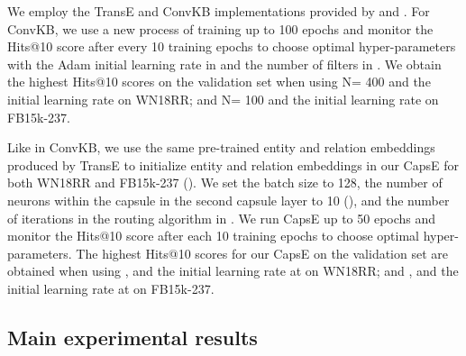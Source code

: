\documentclass[11pt,a4paper]{article}
\begin{document}
We employ the TransE and ConvKB implementations provided by \citet{NguyenNAACL2016} and \citet{Nguyen2018}. 
For ConvKB, we use a new process of training up to 100 epochs and monitor the Hits@10 score after every 10 training epochs to choose optimal hyper-parameters with the Adam initial learning rate in  and the number of filters  in .
We obtain the highest Hits@10 scores on the validation set when using N= 400 and the initial learning rate  on WN18RR; and N= 100 and the initial learning rate  on FB15k-237.

Like in ConvKB, we use the same pre-trained entity and relation embeddings produced by TransE to initialize entity and relation embeddings in our CapsE for both WN18RR and FB15k-237 ().
We set the batch size to 128, the number of neurons within the capsule in the second capsule layer to 10 (), and the number of iterations in the routing algorithm  in .
We run CapsE up to 50 epochs and monitor the Hits@10 score after each 10 training epochs to choose optimal hyper-parameters.
The highest Hits@10 scores for our CapsE on the validation set are obtained when using , 
and the initial learning rate at  on WN18RR; 
and , 
and the initial learning rate at  on FB15k-237.

\subsection{Main experimental results}
\end{document}
